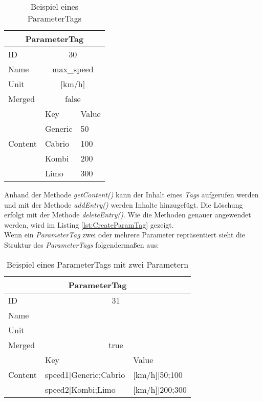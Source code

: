 \begin{table}[h]
\begin{center}
	\begin{tabular}{|l||ll|}
	 \hline
	 \multicolumn{3}{|c|}{ParameterTag}\\
	 \hline\hline
	 ID			& \multicolumn{2}{|c|}{30}\\
	 \hline
	 Name		& \multicolumn{2}{|c|}{max\_speed}\\
	 \hline
	 Unit		& \multicolumn{2}{|c|}{[km/h]}\\
	 \hline
	 Merged		& \multicolumn{2}{|c|}{false}\\
	 \hline
	 \multirow{5}{*}{Content}	&Key			&Value\\ \cline{2-3}
	 							&Generic		&50\\
	 							&Cabrio		&100\\
	 							&Kombi		&200\\
	 							&Limo		&300\\
	 \hline
	\end{tabular}
	
	\caption{Beispiel eines ParameterTags}
	\label{table:ParameterTagStruktur}
\end{center}
\end{table}


Anhand der Methode \textit{getContent()} kann der Inhalt eines \textit{Tags} aufgerufen werden und mit der Methode \textit{addEntry()} werden Inhalte hinzugefügt. Die Löschung erfolgt mit der Methode \textit{deleteEntry()}. Wie die Methoden genauer angewendet werden, wird im Listing \ref{lst:CreateParamTag} gezeigt.\\


Wenn ein \textit{ParameterTag} zwei oder mehrere Parameter repräsentiert sieht die Struktur des \textit{ParameterTags} folgendermaßen aus:

\begin{table}[h]
\begin{center}
	\begin{tabular}{|l||ll|}
	 \hline
	 \multicolumn{3}{|c|}{ParameterTag}\\
	 \hline\hline
	 ID			& \multicolumn{2}{|c|}{31}\\
	 \hline
	 Name		& \multicolumn{2}{|c|}{}\\
	 \hline
	 Unit		& \multicolumn{2}{|c|}{}\\
	 \hline
	 Merged		& \multicolumn{2}{|c|}{true}\\
	 \hline
	 \multirow{3}{*}{Content}	&Key			&Value\\ \cline{2-3}
	 							&speed1|Generic;Cabrio &[km/h]|50;100\\
	 							&speed2|Kombi;Limo     &[km/h]|200;300\\
	 \hline
	\end{tabular}
	
	\caption{Beispiel eines ParameterTags mit zwei Parametern}
	\label{table:PTagMergeStruktur}
\end{center}
\end{table}

